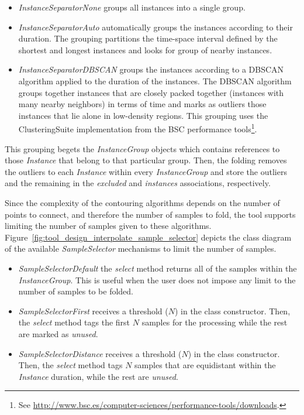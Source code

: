 \begin{itemize}

	\item \textsl{InstanceSeparatorNone} groups all instances into a single group.

	\item \textsl{InstanceSeparatorAuto} automatically groups the instances according to their duration. The grouping partitions the time-space interval defined by the shortest and longest instances and looks for group of nearby instances.

	\item \textsl{InstanceSeparatorDBSCAN} groups the instances according to a DBSCAN algorithm applied to the duration of the instances. The DBSCAN algorithm groups together instances that are closely packed together (instances with many nearby neighbors) in terms of time and marks as outliers those instances that lie alone in low-density regions. This grouping uses the ClusteringSuite implementation from the BSC performance tools\footnote{See \url{http://www.bsc.es/computer-sciences/performance-tools/downloads}.}.

\end{itemize}

This grouping begets the \textsl{InstanceGroup} objects which contains references to those \textsl{Instance} that belong to that particular group.
Then, the folding removes the outliers to each \textsl{Instance} within every \textsl{InstanceGroup} and store the outliers and the remaining in the \textit{excluded} and \textit{instances} associations, respectively.



Since the complexity of the contouring algorithms depends on the number of points to connect, and therefore the number of samples to fold, the \FOLDING tool supports limiting the number of samples given to these algorithms.
Figure~\ref{fig:tool_design_interpolate_sample_selector} depicts the class diagram of the available \textsl{SampleSelector} mechanisms to limit the number of samples.

\begin{itemize}

	\item \textsl{SampleSelectorDefault} the \textit{select} method returns all of the samples within the \textsl{InstanceGroup}. This is useful when the user does not impose any limit to the number of samples to be folded.

	\item \textsl{SampleSelectorFirst} receives a threshold ($N$) in the class constructor. Then, the \textit{select} method tags the first $N$ samples for the processing while the rest are marked as \textit{unused}.

	\item \textsl{SampleSelectorDistance} receives a threshold ($N$) in the class constructor. Then, the \textit{select} method tags $N$ samples that are equidistant within the \textsl{Instance} duration, while the rest are \textit{unused}.

\end{itemize}

